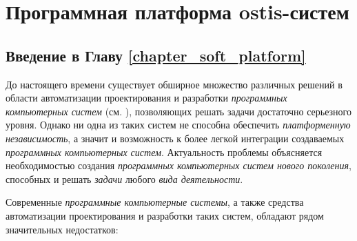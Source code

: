 \chapter{Программная платформа ostis-систем}
\label{chapter_soft_platform}

\vspace{-7\baselineskip}

\begin{SCn}
\end{SCn}

\section*{Введение в Главу \ref{chapter_soft_platform}}

До настоящего времени существует обширное множество различных решений в области автоматизации проектирования и разработки \textit{программных компьютерных систем} (см. ), позволяющих решать задачи достаточно серьезного уровня. Однако ни одна из таких систем не способна обеспечить \textit{платформенную независимость}, а значит и возможность к более легкой интеграции создаваемых \textit{программных компьютерных систем}. Актуальность проблемы объясняется необходимостью создания \textit{программных компьютерных систем нового поколения}, способных  и  решать \textit{задачи} любого \textit{вида деятельности}.

Современные \textit{программные компьютерные системы}, а также средства автоматизации проектирования и разработки таких систем, обладают рядом значительных недостатков:

